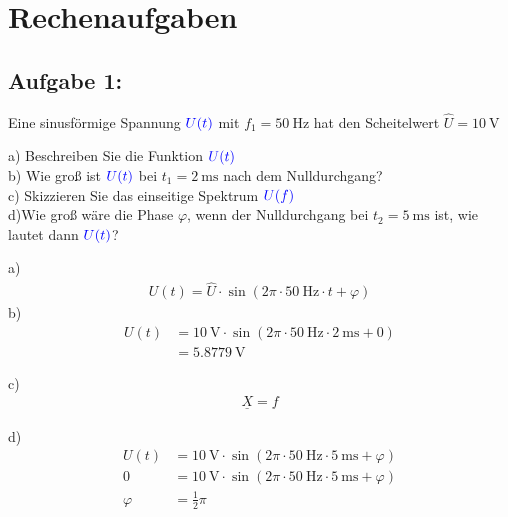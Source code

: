 \documentclass[11pt,a4paper,titlepage]{scrreprt}
\begin{document}
        \section{Rechenaufgaben}
            \subsection{Aufgabe 1:}
                 Eine sinusförmige Spannung $\textcolor{blue}{U(t)}$ mit $f_1 = \SI{50}{\hertz}$ hat den Scheitelwert $\hat{U} = \SI{10}{\volt}$
                 
                 a) Beschreiben Sie die Funktion $\textcolor{blue}{U(t)}$\\
                 b) Wie groß ist  $\textcolor{blue}{U(t)}$ bei $t_1 = \SI{2}{\milli\second}$ nach dem Nulldurchgang?\\
                 c) Skizzieren Sie das einseitige Spektrum $\textcolor{blue}{U(f)}$\\
                 d)Wie groß wäre die Phase $\varphi$, wenn der Nulldurchgang bei $t_2 = \SI{5}{\milli\second}$ ist, wie lautet dann $\textcolor{blue}{U(t)}$? 
                
                a)
                \begin{align*}
                    U(t) = \hat{U} \cdot \sin\left(2\pi \cdot \SI{50}{\hertz} \cdot t + \varphi \right)
                \end{align*}
                b)
                 \begin{align*}
                    U(t) &= \SI{10}{\volt} \cdot \sin\left(2\pi \cdot \SI{50}{\hertz} \cdot \SI{2}{\milli\second} + 0 \right)\\
                    &= \SI{5,8779}{\volt}
                \end{align*}
                \pagebreak
                
                
                c)
                \begin{align*}
                    \underline{X} = f
                \end{align*}
                                    
               d)
                \begin{align*}
                     U(t) &= \SI{10}{\volt} \cdot \sin\left(2\pi \cdot \SI{50}{\hertz} \cdot \SI{5}{\milli\second} + \varphi \right)\\
                     0 &= \SI{10}{\volt} \cdot \sin\left(2\pi \cdot \SI{50}{\hertz} \cdot \SI{5}{\milli\second} + \varphi \right)\\
                     \varphi &=  \frac12\pi
                \end{align*}
                
\end{document}
